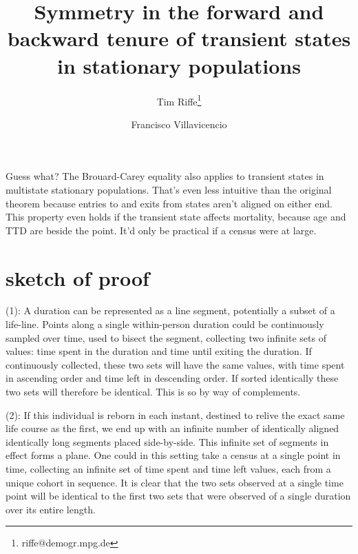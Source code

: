 \documentclass[12pt,oneside,a4paper]{article} %
\theoremstyle{definition}
\begin{document}
\title{Symmetry in the forward and backward tenure of transient states in
stationary populations}
\author[1]{Tim Riffe\thanks{riffe@demogr.mpg.de}}
\author[2,3]{Francisco Villavicencio}

\maketitle

\begin{abstract}

\end{abstract}
Guess what? The Brouard-Carey equality also applies to transient states in
multistate stationary populations. That's even less intuitive than the original
theorem because entries to and exits from states aren't aligned on either end.
This property even holds if the transient state affects mortality, because age
and TTD are beside the point. It'd only be practical if a census were at large.

\section{sketch of proof}

(1): A duration can be represented as a line segment, potentially a
subset of a life-line. Points along a single within-person duration could be continuously
sampled over time, used to bisect the segment, collecting two infinite sets of
values: time spent in the duration and time until exiting the duration. If
continuously collected, these two sets will have the same values, with time
spent in ascending order and time left in descending order. If sorted
identically these two sets will therefore be identical. This is so by way of
complements.

(2): If this individual is reborn in each instant, destined to relive the
exact same life course as the first, we end up with an infinite
number of identically aligned identically long segments placed side-by-side.
This infinite set of segments in effect forms a plane. One could in this
setting take a census at a single point in time, collecting an infinite set of
time spent and time left values, each from a unique cohort in sequence. It is
clear that the two sets observed at a single time point will be identical
to the first two sets that were observed of a single duration over its entire
length.
\end{document}
